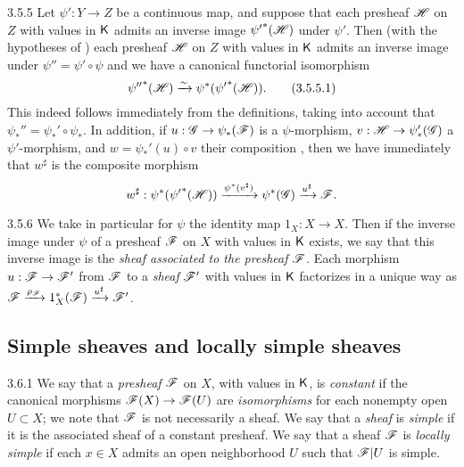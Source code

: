 \begin{env}{3.5.5}
\label{env-0.3.5.5}
Let $\psi':Y\to Z$ be a continuous map, and suppose that each presheaf $\mathscr{H}$
on $Z$ with values in $\mathsf{K}$ admits an inverse image ${\psi'}^*(\mathscr{H})$ under
$\psi'$. Then (with the hypotheses of ) each presheaf $\mathscr{H}$
on $Z$ with values in $\mathsf{K}$ admits an inverse image under $\psi''=\psi'\circ\psi$
and we have a canonical functorial isomorphism
\[
  {\psi''}^*(\mathscr{H})\xrightarrow{\sim}\psi^*({\psi'}^*(\mathscr{H})).
  \tag{3.5.5.1}
\]
This indeed follows immediately from the definitions, taking into account that
$\psi_*''=\psi_*'\circ\psi_*$. In addition, if $u:\mathscr{G}\to\psi_*(\mathscr{F})$ is a
$\psi$-morphism, $v:\mathscr{H}\to\psi_*'(\mathscr{G})$ a $\psi'$-morphism, and
$w=\psi_*'(u)\circ v$ their composition , then we have
immediately that $w^\sharp$ is the composite morphism
\[
  w^\sharp:\psi^*({\psi'}^*(\mathscr{H}))\xrightarrow{\psi^*(v^\sharp)}\psi^*(\mathscr{G})
  \xrightarrow{u^\sharp}\mathscr{F}.
\]
\end{env}

\begin{env}{3.5.6}
\label{env-0.3.5.6}
We take in particular for $\psi$ the identity map $1_X:X\to X$. Then if the
inverse image under $\psi$ of a presheaf $\mathscr{F}$ on $X$ with values in $\mathsf{K}$
exists, we say that this inverse image is the \emph{sheaf associated to the
presheaf $\mathscr{F}$}. Each morphism $u:\mathscr{F}\to\mathscr{F}'$ from $\mathscr{F}$ to a
\emph{sheaf} $\mathscr{F}'$ with values in $\mathsf{K}$ factorizes in a unique way as
$\mathscr{F}\xrightarrow{\rho_\mathscr{F}}1_X^*(\mathscr{F})\xrightarrow{u^\sharp}\mathscr{F}'$.
\end{env}

\subsection{Simple sheaves and locally simple sheaves}
\label{0-prelim-3.6}

\begin{env}{3.6.1}
\label{env-0.3.6.1}
We say that a \emph{presheaf} $\mathscr{F}$ on $X$, with values in $\mathsf{K}$, is
\emph{constant} if the canonical morphisms $\mathscr{F}(X)\to\mathscr{F}(U)$ are
\emph{isomorphisms} for each nonempty open $U\subset X$; we note that $\mathscr{F}$
is not necessarily a sheaf. We say that a \emph{sheaf} is \emph{simple} if it is
the associated sheaf  of a constant presheaf. We say that a
sheaf $\mathscr{F}$ is \emph{locally simple} if each $x\in X$ admits an open
neighborhood $U$ such that $\mathscr{F}|U$ is simple.
\end{env}

